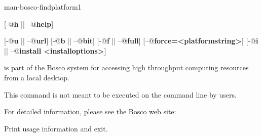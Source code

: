 \begin{ManPage}{}{man-bosco-findplatform}{1}
{}


\Synopsis {}
[\verb@-@\textbf{h} || \verb@--@\textbf{help}]

[\verb@-@\textbf{u} || \verb@--@\textbf{url}]
[\verb@-@\textbf{b} || \verb@--@\textbf{bit}]
[\verb@-@\textbf{f} || \verb@--@\textbf{full}]
[\verb@--@\textbf{force=<platformstring>}]
[\verb@-@\textbf{i} || \verb@--@\textbf{install <installoptions>}]

\Description

 is part of the Bosco system for accessing high
throughput computing resources from a local desktop.

This command is not meant to be executed on the command line by users.

For detailed information, please see the Bosco web site:

\begin{Options}
   {Print usage information and exit.}

\end{Options}


\end{ManPage}
